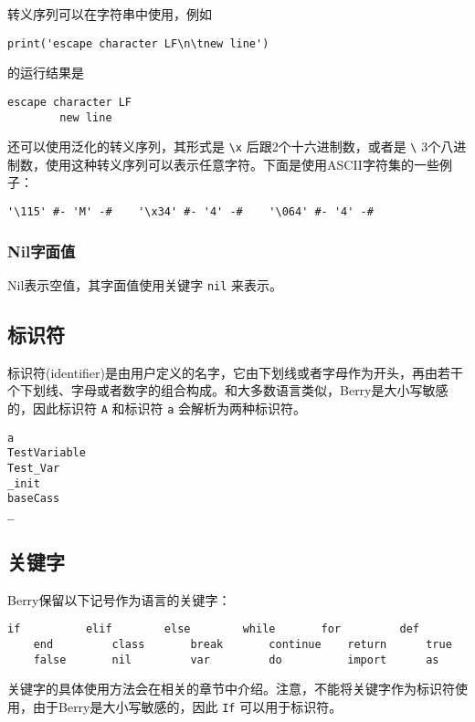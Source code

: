 转义序列可以在字符串中使用，例如
\begin{lstlisting}[language=berry, numbers=none]
print('escape character LF\n\tnew line')
\end{lstlisting}
的运行结果是
\begin{lstlisting}[numbers=none]
escape character LF
        new line
\end{lstlisting}

还可以使用泛化的转义序列，其形式是 \texttt{\textbackslash x} 后跟2个十六进制数，或者是 \texttt{\textbackslash} 3个八进制数，使用这种转义序列可以表示任意字符。下面是使用ASCII字符集的一些例子：
\begin{lstlisting}[language=berry, numbers=none]
'\115' #- 'M' -#    '\x34' #- '4' -#    '\064' #- '4' -#
\end{lstlisting}

\subsubsection{Nil字面值}

Nil表示空值，其字面值使用关键字 \texttt{nil} 来表示。

\subsection{标识符} \label{section:identifier}

标识符(identifier)是由用户定义的名字，它由下划线或者字母作为开头，再由若干个下划线、字母或者数字的组合构成。和大多数语言类似，Berry是大小写敏感的，因此标识符 \texttt{A} 和标识符 \texttt{a} 会解析为两种标识符。
\begin{lstlisting}[language=berry, numbers=none]
a
TestVariable
Test_Var
_init
baseCass
_
\end{lstlisting}

\subsection{关键字}

Berry保留以下记号作为语言的关键字：
\begin{lstlisting}[language=berry, numbers=none]
    if          elif        else        while       for         def
    end         class       break       continue    return      true
    false       nil         var         do          import      as
\end{lstlisting}

关键字的具体使用方法会在相关的章节中介绍。注意，不能将关键字作为标识符使用，由于Berry是大小写敏感的，因此 \texttt{If} 可以用于标识符。
